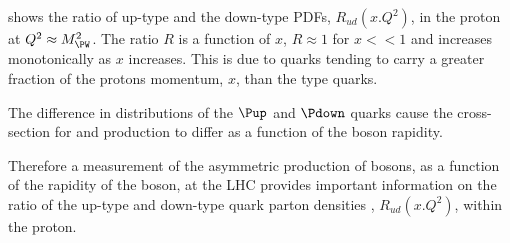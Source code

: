  shows the ratio of up-type and the down-type \acp{PDF},
$R_{ud}(x.Q^2)$, in the proton at $Q^2\approx M_{\PW}^2$. 
The ratio $R$ is a function of $x$, $R \approx 1$ for $x<<1$ and increases
monotonically as $x$ increases.  
This is due to \Pup quarks tending to carry a greater fraction of the protons
momentum, $x$, than the \Pdown type quarks.


The difference in distributions of the $\Pup$ and $\Pdown$ quarks cause the
cross-section for \PWp and \PWm production to differ as a function of the boson
rapidity.

Therefore a measurement of the asymmetric production of \PW bosons, as a
function of the rapidity of the boson, at the \ac{LHC} provides important
information on the ratio of the up-type and down-type quark parton densities ,
$R_{ud}(x.Q^2)$, within the proton. 





